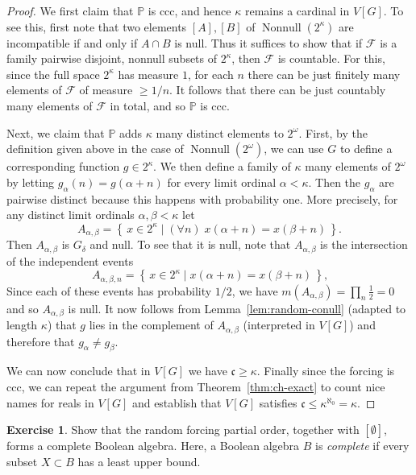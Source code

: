 \documentclass[11pt,oneside,a4paper]{amsbook}
\newcommand{\set}[1]{\left\{\,#1\,\right\}}
\newcommand{\PP}{\mathbb P}
\DeclareMathOperator{\Nonnull}{Nonnull}
\theoremstyle{definition}
\newtheorem{exercise}{Exercise}[section]
\theoremstyle{plain}
\theoremstyle{definition}
\theoremstyle{remark}
\numberwithin{equation}{section}
\numberwithin{figure}{section}
\begin{document}
\begin{proof}
  We first claim that $\PP$ is ccc, and hence $\kappa$ remains a cardinal in $V[G]$. To see this, first note that two elements $[A],[B]$ of $\Nonnull(2^\kappa)$ are incompatible if and only if $A\cap B$ is null. Thus it suffices to show that if $\mathcal F$ is a family pairwise disjoint, nonnull subsets of $2^\kappa$, then $\mathcal F$ is countable. For this, since the full space $2^\kappa$ has measure $1$, for each $n$ there can be just finitely many elements of $\mathcal F$ of measure $\geq1/n$. It follows that there can be just countably many elements of $\mathcal F$ in total, and so $\PP$ is ccc.

  Next, we claim that $\PP$ adds $\kappa$ many distinct elements to $2^\omega$. First, by the definition given above in the case of $\Nonnull(2^\omega)$, we can use $G$ to define a corresponding function $g\in2^\kappa$. We then define a family of $\kappa$ many elements of $2^\omega$ by letting $g_\alpha(n)=g(\alpha+n)$ for every limit ordinal $\alpha<\kappa$. Then the $g_\alpha$ are pairwise distinct because this happens with probability one. More precisely, for any distinct limit ordinals $\alpha,\beta<\kappa$ let
  \[A_{\alpha,\beta}=\set{x\in2^\kappa\mid(\forall n)\;x(\alpha+n)=x(\beta+n)}\text{.}
  \]
  Then $A_{\alpha,\beta}$ is $G_\delta$ and null. To see that it is null, note that $A_{\alpha,\beta}$ is the intersection of the independent events
  \[A_{\alpha,\beta,n}=\set{x\in2^\kappa\mid x(\alpha+n)=x(\beta+n)}\text{,}
  \]
  Since each of these events has probability $1/2$, we have $m(A_{\alpha,\beta})=\prod_n\frac12=0$ and so $A_{\alpha,\beta}$ is null. It now follows from Lemma~\ref{lem:random-conull} (adapted to length $\kappa$) that $g$ lies in the complement of $A_{\alpha,\beta}$ (interpreted in $V[G]$) and therefore that $g_\alpha\neq g_\beta$.

  We can now conclude that in $V[G]$ we have $\mathfrak c\geq\kappa$. Finally since the forcing is ccc, we can repeat the argument from Theorem~\ref{thm:ch-exact} to count nice names for reals in $V[G]$ and establish that $V[G]$ satisfies $\mathfrak c\leq\kappa^{\aleph_0}=\kappa$.
\end{proof}


\begin{exercise}
  Show that the random forcing partial order, together with $[\emptyset]$, forms a complete Boolean algebra. Here, a Boolean algebra $B$ is \emph{complete} if every subset $X\subset B$ has a least upper bound.
\end{exercise}
\end{document}
